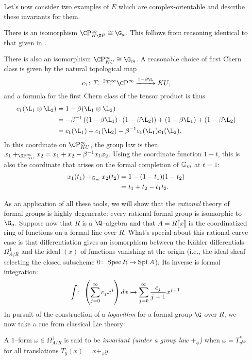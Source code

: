 Let's now consider two examples of $E$ which are complex-orientable and describe these invariants for them.

\begin{example}\label{HZGivesGa}
There is an isomorphism $\CP^\infty_{H\Z P} \cong \G_a$.  This follows from reasoning identical to that given in .
\end{example}

\begin{example}\label{CPinftyKUExample}
There is also an isomorphism $\CP^\infty_{KU} \cong \G_m$.  A reasonable choice of first Chern class is given by the natural topological map \[c_1\co \Susp^{-2} \Susp^\infty \CP^\infty \xrightarrow{1 - \beta \L} KU,\] and a formula for the first Chern class of the tensor product is thus
\begin{align*}
c_1(\L_1 \otimes \L_2) & = 1 - \beta(\L_1 \otimes \L_2) \\
& = -\beta^{-1} \left( (1 - \beta \L_1) \cdot (1 - \beta \L_2) \right) + (1 - \beta \L_1) + (1 - \beta \L_2) \\
& = c_1(\L_1) + c_1(\L_2) - \beta^{-1} c_1(\L_1) c_1(\L_2).
\end{align*}
In this coordinate on $\CP^\infty_{KU}$, the group law is then $x_1 +_{\CP^\infty_{KU}} x_2 = x_1 + x_2 - \beta^{-1} x_1 x_2$.  Using the coordinate function $1 - t$, this is also the coordinate that arises on the formal completion of $\mathbb G_m$ at $t = 1$:
\begin{align*}
x_1(t_1) +_{\mathbb G_m} x_2(t_2) & = 1 - (1 - t_1)(1 - t_2) \\
& = t_1 + t_2 - t_1 t_2.
\end{align*}
\end{example}

As an application of all these tools, we will show that the \emph{rational} theory of formal groups is highly degenerate: every rational formal group is isomorphic to $\G_a$.  Suppose now that $R$ is a $\Q$--algebra and that $A = R\llbracket x \rrbracket$ is the coordinatized ring of functions on a formal line over $R$.  What's special about this rational curve case is that differentiation gives an isomorphism between the K\"ahler differentials $\Omega^1_{A/R}$ and the ideal $(x)$ of functions vanishing at the origin (i.e., the ideal sheaf selecting the closed subscheme $0\colon\thinspace \operatorname{Spec} R \to \operatorname{Spf} A$).  Its inverse is formal integration: \[\int \colon\thinspace \left(\sum_{j=0}^\infty c_j x^j \right) dx \mapsto \sum_{j=0}^\infty \frac{c_j}{j+1} x^{j+1}.\]  In pursuit of the construction of a \textit{logarithm} for a formal group $\G$ over $R$, we now take a cue from classical Lie theory:
\begin{definition}
A $1$--form $\omega \in \Omega^1_{A/R}$ is said to be \textit{invariant (under a group law $+_\phi$)} when $\omega = T_y^* \omega$ for all translations $T_y(x) = x +_\phi y$.
\end{definition}

